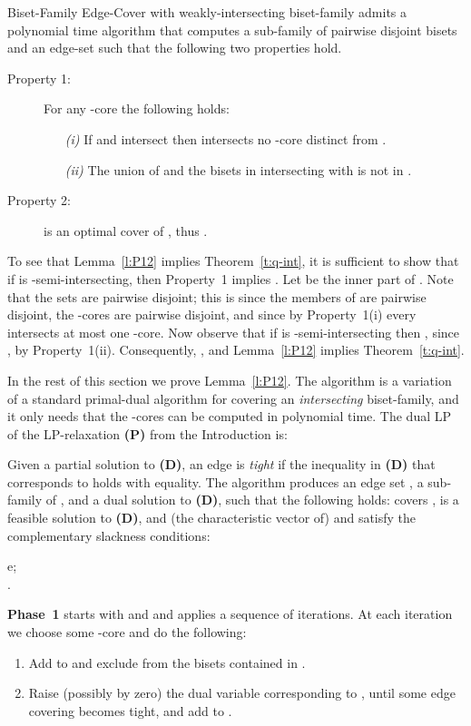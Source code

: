 \begin{lemma} \label{l:P12}
{\sf Biset-Family Edge-Cover} with weakly-intersecting biset-family  admits a polynomial time algorithm 
that computes a sub-family  of pairwise disjoint bisets  
and an edge-set  such that the following two properties hold.
\begin{description}
\item[Property 1:] 
For any -core  the following holds:
\begin{itemize}
\item[{\em (i)}]
If  and  intersect then  intersects 
no -core distinct from . 
\item[{\em (ii)}]
The union  of  and the bisets in  intersecting with 
is not in .
\end{itemize}
\item[Property 2:] 
 is an optimal cover of , thus
. 
\end{description}
\end{lemma}

To see that Lemma~\ref{l:P12} implies Theorem~\ref{t:q-int},
it is sufficient to show that if  is -semi-intersecting, then 
Property~1 implies .
Let  be the inner part of .
Note that the sets  are pairwise disjoint;
this is since the members of  are pairwise disjoint, the -cores are pairwise disjoint, 
and since by Property~1(i) every  intersects at most one -core.
Now observe that if  is -semi-intersecting then , 
since , by Property~1(ii).
Consequently, ,
and Lemma~\ref{l:P12} implies Theorem~\ref{t:q-int}.

In the rest of this section we prove Lemma~\ref{l:P12}.
The algorithm is a variation of a standard primal-dual algorithm
for covering an {\em intersecting} biset-family, and it only needs that the 
-cores can be computed in polynomial time. 
The dual LP of the LP-relaxation {\bf (P)} from the Introduction is:

Given a partial solution  to {\bf (D)}, an edge  is {\em tight}
if the inequality in {\bf (D)} that corresponds to  holds with equality.
The algorithm produces an edge set , a sub-family  of ,
and a dual solution  to {\bf (D)}, such that the following holds: 
 covers ,  is a feasible solution to {\bf (D)},
and (the characteristic vector of)  and  satisfy the complementary slackness conditions: 

\noindent
e; \\
.

{\bf Phase~1} starts with  and  and applies a sequence of iterations.
At each iteration we choose some -core  and do the following:
\begin{enumerate}
\item
Add  to  and exclude from  the bisets contained in .
\item
Raise (possibly by zero) the dual variable corresponding to , 
until some edge  covering  becomes tight, and add  to .
\end{enumerate}

